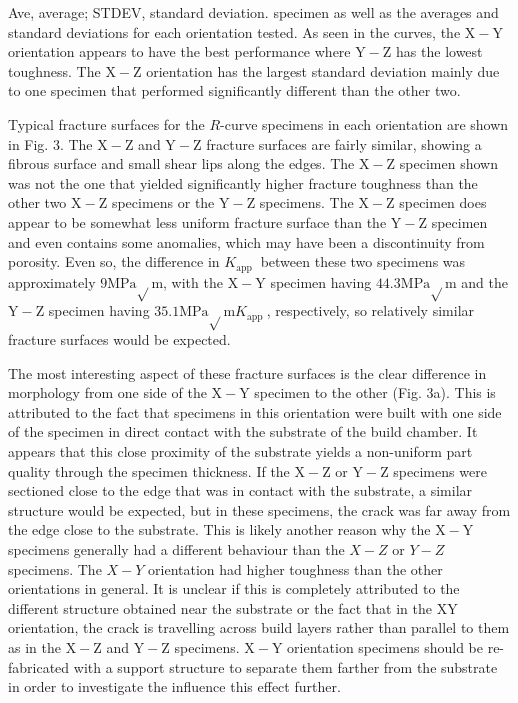 \documentclass[10pt]{article}
\begin{document}
Ave, average; STDEV, standard deviation. specimen as well as the averages and standard deviations for each orientation tested. As seen in the curves, the $\mathrm{X}-\mathrm{Y}$ orientation appears to have the best performance where $\mathrm{Y}-\mathrm{Z}$ has the lowest toughness. The $\mathrm{X}-\mathrm{Z}$ orientation has the largest standard deviation mainly due to one specimen that performed significantly different than the other two.

Typical fracture surfaces for the $R$-curve specimens in each orientation are shown in Fig. 3. The $\mathrm{X}-\mathrm{Z}$ and $\mathrm{Y}-\mathrm{Z}$ fracture surfaces are fairly similar, showing a fibrous surface and small shear lips along the edges. The $\mathrm{X}-\mathrm{Z}$ specimen shown was not the one that yielded significantly higher fracture toughness than the other two $\mathrm{X}-\mathrm{Z}$ specimens or the $\mathrm{Y}-\mathrm{Z}$ specimens. The $\mathrm{X}-\mathrm{Z}$ specimen does appear to be somewhat less uniform fracture surface than the $\mathrm{Y}-\mathrm{Z}$ specimen and even contains some anomalies, which may have been a discontinuity from porosity. Even so, the difference in $K_{\text {app }}$ between these two specimens was approximately $9 \mathrm{MPa} \sqrt{ } \mathrm{m}$, with the $\mathrm{X}-\mathrm{Y}$ specimen having $44.3 \mathrm{MPa} \sqrt{ } \mathrm{m}$ and the $\mathrm{Y}-\mathrm{Z}$ specimen having $35.1 \mathrm{MPa} \sqrt{ } \mathrm{m} K_{\text {app }}$, respectively, so relatively similar fracture surfaces would be expected.

The most interesting aspect of these fracture surfaces is the clear difference in morphology from one side of the $\mathrm{X}-\mathrm{Y}$ specimen to the other (Fig. 3a). This is attributed to the fact that specimens in this orientation were built with one side of the specimen in direct contact with the substrate of the build chamber. It appears that this close proximity of the substrate yields a non-uniform part quality through the specimen thickness. If the $\mathrm{X}-\mathrm{Z}$ or $\mathrm{Y}-\mathrm{Z}$ specimens were sectioned close to the edge that was in contact with the substrate, a similar structure would be expected, but in these specimens, the crack was far away from the edge close to the substrate. This is likely another reason why the $\mathrm{X}-\mathrm{Y}$ specimens generally had a different behaviour than the $X-Z$ or $Y-Z$ specimens. The $X-Y$ orientation had higher toughness than the other orientations in general. It is unclear if this is completely attributed to the different structure obtained near the substrate or the fact that in the XY orientation, the crack is travelling across build layers rather than parallel to them as in the $\mathrm{X}-\mathrm{Z}$ and $\mathrm{Y}-\mathrm{Z}$ specimens. $\mathrm{X}-\mathrm{Y}$ orientation specimens should be re-fabricated with a support structure to separate them farther from the substrate in order to investigate the influence this effect further.
\end{document}
